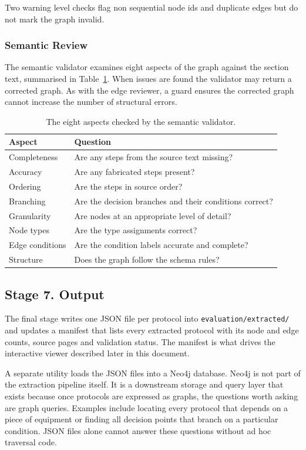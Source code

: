 \documentclass{article}
\begin{document}
Two warning level checks flag non sequential node ids and duplicate
edges but do not mark the graph invalid.

\subsubsection{Semantic Review}

The semantic validator examines eight aspects of the graph against the
section text, summarised in Table~\ref{tab:semantic}. When issues are
found the validator may return a corrected graph. As with the edge
reviewer, a guard ensures the corrected graph cannot increase the
number of structural errors.

\begin{table}[H]
\centering
\begin{tabularx}{\textwidth}{l X}
\toprule
\textbf{Aspect} & \textbf{Question} \\
\midrule
Completeness    & Are any steps from the source text missing? \\
Accuracy        & Are any fabricated steps present? \\
Ordering        & Are the steps in source order? \\
Branching       & Are the decision branches and their conditions correct? \\
Granularity     & Are nodes at an appropriate level of detail? \\
Node types      & Are the type assignments correct? \\
Edge conditions & Are the condition labels accurate and complete? \\
Structure       & Does the graph follow the schema rules? \\
\bottomrule
\end{tabularx}
\caption{The eight aspects checked by the semantic validator.}
\label{tab:semantic}
\end{table}

\subsection{Stage 7. Output}

The final stage writes one JSON file per protocol into
\texttt{evaluation/extracted/} and updates a manifest that lists every
extracted protocol with its node and edge counts, source pages and
validation status. The manifest is what drives the interactive viewer
described later in this document.

A separate utility loads the JSON files into a Neo4j database. Neo4j
is not part of the extraction pipeline itself. It is a downstream
storage and query layer that exists because once protocols are
expressed as graphs, the questions worth asking are graph queries.
Examples include locating every protocol that depends on a piece of
equipment or finding all decision points that branch on a particular
condition. JSON files alone cannot answer these questions without ad
hoc traversal code.
\end{document}
